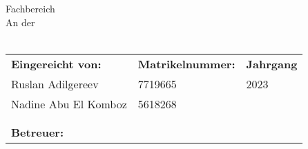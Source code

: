 \begin{titlepage}

	\thispagestyle{plain}

	\begin{figure}[H]
	\begin{flushright}
	\end{flushright}
	\end{figure}
	\vspace{-5pt}
	\begin{center}
		\vspace{2cm}
		\begin{LARGE}
			\art
			\\
			\vspace{16pt}
		\end{LARGE}
		\begin{Huge}
			\titel
			\\		
			\vspace{14pt}
		\end{Huge}
		\begin{LARGE}
			\untertitel	
		\end{LARGE}
	\end{center}

	\begin{center}
		Fachbereich \studienfach\\
		
		An der \hochschule \\ \campus\\
	\end{center}

	\let\stretchbuffer\arraystretch %
	\renewcommand{\arraystretch}{1} %
	\begin{table}[b!]
		\normalsize
		\begin{tabularx}{\textwidth}{lXX}
			\textbf{Eingereicht von:} 				& \textbf{Matrikelnummer:}	& \textbf{Jahrgang} \\
			Ruslan Adilgereev 						& 7719665				& 2023 \\
			Nadine Abu El Komboz					& 5618268			& \jahrgang \\
			\autor 									& \matrikelnr				& \jahrgang \\

			\\[1cm]
			\textbf{Betreuer:} 	& \gutachter & \\
		\end{tabularx}
	\end{table}
	\renewcommand{\arraystretch}{\stretchbuffer} %
	\clearpage
\end{titlepage}

